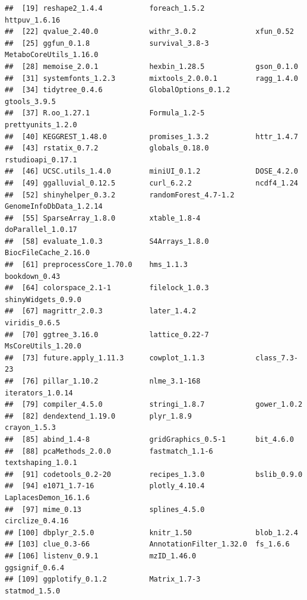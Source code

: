 \documentclass[9pt,a4paper,]{extarticle}
\begin{document}
\begin{verbatim}
##  [19] reshape2_1.4.4           foreach_1.5.2            httpuv_1.6.16           
##  [22] qvalue_2.40.0            withr_3.0.2              xfun_0.52               
##  [25] ggfun_0.1.8              survival_3.8-3           MetaboCoreUtils_1.16.0  
##  [28] memoise_2.0.1            hexbin_1.28.5            gson_0.1.0              
##  [31] systemfonts_1.2.3        mixtools_2.0.0.1         ragg_1.4.0              
##  [34] tidytree_0.4.6           GlobalOptions_0.1.2      gtools_3.9.5            
##  [37] R.oo_1.27.1              Formula_1.2-5            prettyunits_1.2.0       
##  [40] KEGGREST_1.48.0          promises_1.3.2           httr_1.4.7              
##  [43] rstatix_0.7.2            globals_0.18.0           rstudioapi_0.17.1       
##  [46] UCSC.utils_1.4.0         miniUI_0.1.2             DOSE_4.2.0              
##  [49] ggalluvial_0.12.5        curl_6.2.2               ncdf4_1.24              
##  [52] shinyhelper_0.3.2        randomForest_4.7-1.2     GenomeInfoDbData_1.2.14 
##  [55] SparseArray_1.8.0        xtable_1.8-4             doParallel_1.0.17       
##  [58] evaluate_1.0.3           S4Arrays_1.8.0           BiocFileCache_2.16.0    
##  [61] preprocessCore_1.70.0    hms_1.1.3                bookdown_0.43           
##  [64] colorspace_2.1-1         filelock_1.0.3           shinyWidgets_0.9.0      
##  [67] magrittr_2.0.3           later_1.4.2              viridis_0.6.5           
##  [70] ggtree_3.16.0            lattice_0.22-7           MsCoreUtils_1.20.0      
##  [73] future.apply_1.11.3      cowplot_1.1.3            class_7.3-23            
##  [76] pillar_1.10.2            nlme_3.1-168             iterators_1.0.14        
##  [79] compiler_4.5.0           stringi_1.8.7            gower_1.0.2             
##  [82] dendextend_1.19.0        plyr_1.8.9               crayon_1.5.3            
##  [85] abind_1.4-8              gridGraphics_0.5-1       bit_4.6.0               
##  [88] pcaMethods_2.0.0         fastmatch_1.1-6          textshaping_1.0.1       
##  [91] codetools_0.2-20         recipes_1.3.0            bslib_0.9.0             
##  [94] e1071_1.7-16             plotly_4.10.4            LaplacesDemon_16.1.6    
##  [97] mime_0.13                splines_4.5.0            circlize_0.4.16         
## [100] dbplyr_2.5.0             knitr_1.50               blob_1.2.4              
## [103] clue_0.3-66              AnnotationFilter_1.32.0  fs_1.6.6                
## [106] listenv_0.9.1            mzID_1.46.0              ggsignif_0.6.4          
## [109] ggplotify_0.1.2          Matrix_1.7-3             statmod_1.5.0           

\end{verbatim}
\end{document}
